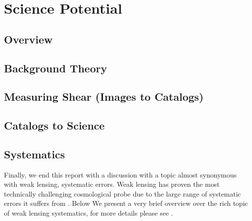 \chapter{Science Potential}
\section{Overview}


\section{Background Theory}



\section{Measuring Shear (Images to Catalogs)}


\section{Catalogs to Science}


\section{Systematics}
Finally, we end this report with a discussion with a topic almost synonymous with weak lensing, systematic errors. Weak lensing has proven the most technically challenging cosmological probe due to the large range of systematic errors it suffers from \cite{general_2013}. Below We present a very brief overview over the rich topic of weak lensing systematics, for more details please see \cite{massey_2013,general_2013}.


